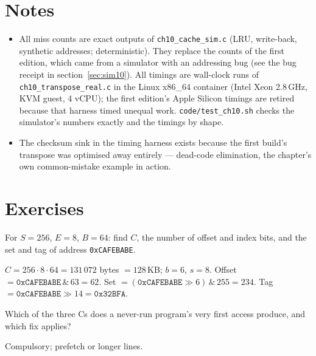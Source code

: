 \section*{Notes}
\label{sec:notes10}
\begin{itemize}
\item All miss counts are exact outputs of
      \texttt{ch10\_cache\_sim.c} (LRU, write-back, synthetic
      addresses; deterministic). They replace the counts of the
      first edition, which came from a simulator with an
      addressing bug (see the bug receipt in section~\ref{sec:sim10}). All
      timings are wall-clock runs of \texttt{ch10\_transpose\_real.c}
      in the Linux x86\_64 container (Intel Xeon 2.8\,GHz, KVM guest,
      4 vCPU); the first edition's Apple Silicon timings are retired
      because that harness timed unequal work. \texttt{code/test\_ch10.sh}
      checks the simulator's numbers exactly and the timings by shape.
\item The checksum sink in the timing harness exists because the
      first build's transpose was optimised away entirely ---
      dead-code elimination, the chapter's own common-mistake
      example in action.
\end{itemize}

\section*{Exercises}

\begin{exercise}[easy]
For $S{=}256$, $E{=}8$, $B{=}64$: find $C$, the number of offset and index
bits, and the set and tag of address \texttt{0xCAFEBABE}.
\end{exercise}
\begin{solution}[hint]
$C=256\cdot8\cdot64=131\,072$ bytes $=128$\,KB; $b=6$, $s=8$. Offset
$=\texttt{0xCAFEBABE}\,\&\,63=62$. Set $=(\texttt{0xCAFEBABE}\gg6)\,\&\,255=234$.
Tag $=\texttt{0xCAFEBABE}\gg14=\texttt{0x32BFA}$.
\end{solution}

\begin{exercise}[easy]
Which of the three Cs does a never-run program's very first access
produce, and which fix applies?
\end{exercise}
\begin{solution}[hint]
Compulsory; prefetch or longer lines.
\end{solution}

